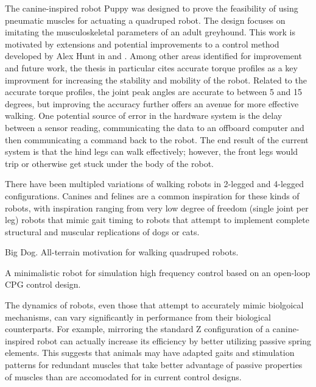 
The canine-inspired robot Puppy was designed to prove the feasibility of using
pneumatic muscles for actuating a quadruped robot. The design focuses on 
imitating the musculoskeletal parameters of an adult greyhound. 
\cite{PuppyDesign} This work is motivated by extensions and potential
improvements to a control method developed by Alex Hunt in
\cite{HuntPhDThesis} and \cite{HuntHindLegWalking}. Among other areas identified
for improvement and future work, the thesis in particular cites accurate torque
profiles as a key improvment for increasing the stability and mobility of the
robot. Related to the accurate torque profiles, the joint peak angles are
accurate to between 5 and 15 degrees, but improving the accuracy further offers
an avenue for more effective walking. One potential source of error in the
hardware system is the delay between a sensor reading, communicating the data to
an offboard computer and then communicating a command back to the robot. The end
result of the current system is that the hind legs can walk effectively;
however, the front legs would trip or otherwise get stuck under the body of the
robot.


There have been multipled variations of walking robots in 2-legged and 4-legged
configurations. Canines and felines are a common inspiration for these kinds of
robots, with inspiration ranging from very low degree of freedom (single joint
per leg) robots that mimic gait timing to robots that attempt to implement
complete structural and muscular replications of dogs or cats.


Big Dog. All-terrain motivation for walking quadruped robots. \cite{BigDog}

A minimalistic robot for simulation high frequency control based on an open-loop
CPG control design. 
\cite{Narioka2012}


The dynamics of robots, even those that attempt to accurately mimic biolgoical
mechanisms, can vary significantly in performance from their biological
counterparts. For example, mirroring the standard Z configuration of a canine-
inspired robot can actually increase its efficiency by better utilizing passive
spring elements. This suggests that animals may have adapted gaits and
stimulation patterns for redundant muscles that take better advantage of passive
properties of muscles than are accomodated for in current control designs.
\cite{HindLegMorphology}

